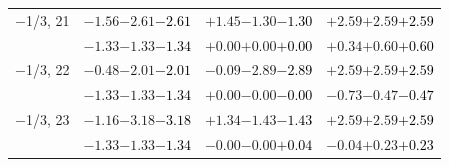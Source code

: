 \documentclass[compress]{beamer}
\begin{document}
\begin{frame}
\begin{tabular}{r | c | c | c}
$-$1/3, 21 & $-1.56$\hspace{0.1 cm}$-2.61$\hspace{0.1 cm}\textcolor{black}{$-2.61$} & $+1.45$\hspace{0.1 cm}$-1.30$\hspace{0.1 cm}\textcolor{black}{$-1.30$} & $+2.59$\hspace{0.1 cm}$+2.59$\hspace{0.1 cm}\textcolor{black}{$+2.59$} \\
           & $-1.33$\hspace{0.1 cm}$-1.33$\hspace{0.1 cm}\textcolor{black}{$-1.34$} & $+0.00$\hspace{0.1 cm}$+0.00$\hspace{0.1 cm}\textcolor{black}{$+0.00$} & $+0.34$\hspace{0.1 cm}$+0.60$\hspace{0.1 cm}\textcolor{black}{$+0.60$} \\
$-$1/3, 22 & $-0.48$\hspace{0.1 cm}$-2.01$\hspace{0.1 cm}\textcolor{black}{$-2.01$} & $-0.09$\hspace{0.1 cm}$-2.89$\hspace{0.1 cm}\textcolor{black}{$-2.89$} & $+2.59$\hspace{0.1 cm}$+2.59$\hspace{0.1 cm}\textcolor{black}{$+2.59$} \\
           & $-1.33$\hspace{0.1 cm}$-1.33$\hspace{0.1 cm}\textcolor{black}{$-1.34$} & $+0.00$\hspace{0.1 cm}$-0.00$\hspace{0.1 cm}\textcolor{black}{$-0.00$} & $-0.73$\hspace{0.1 cm}$-0.47$\hspace{0.1 cm}\textcolor{black}{$-0.47$} \\
$-$1/3, 23 & $-1.16$\hspace{0.1 cm}$-3.18$\hspace{0.1 cm}\textcolor{black}{$-3.18$} & $+1.34$\hspace{0.1 cm}$-1.43$\hspace{0.1 cm}\textcolor{black}{$-1.43$} & $+2.59$\hspace{0.1 cm}$+2.59$\hspace{0.1 cm}\textcolor{black}{$+2.59$} \\
           & $-1.33$\hspace{0.1 cm}$-1.33$\hspace{0.1 cm}\textcolor{black}{$-1.34$} & $-0.00$\hspace{0.1 cm}$-0.00$\hspace{0.1 cm}\textcolor{black}{$+0.04$} & $-0.04$\hspace{0.1 cm}$+0.23$\hspace{0.1 cm}\textcolor{black}{$+0.23$} \\

\end{tabular}
\end{frame}
\end{document}
